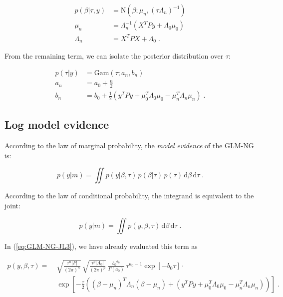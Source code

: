 \vspace{-0.5em}
\begin{equation} \label{eq:GLM-NG-post-beta}
\begin{split}
p(\beta|\tau,y) &= \mathrm{N}(\beta; \mu_n, (\tau \Lambda_n)^{-1}) \\
\mu_n &= \Lambda_n^{-1} (X^T P y + \Lambda_0 \mu_0) \\
\Lambda_n &= X^T P X + \Lambda_0 \; .
\end{split}
\end{equation}

From the remaining term, we can isolate the posterior distribution over $\tau$:

\vspace{-0.5em}
\begin{equation} \label{eq:GLM-NG-post-tau}
\begin{split}
p(\tau|y) &= \mathrm{Gam}(\tau; a_n, b_n) \\
a_n &= a_0 + \frac{n}{2} \\
b_n &= b_0 + \frac{1}{2} (y^T P y + \mu_0^T \Lambda_0 \mu_0 - \mu_n^T \Lambda_n \mu_n) \; .
\end{split}
\end{equation}


\subsection{Log model evidence} \label{sec:GLM-NG-LME}

According to the law of marginal probability, the \textit{model evidence} of the GLM-NG is:

\begin{equation} \label{eq:GLM-NG-ME1}
p(y|m) = \iint p(y|\beta,\tau) \, p(\beta|\tau) \, p(\tau) \, \mathrm{d}\beta \, \mathrm{d}\tau \; .
\end{equation}

According to the law of conditional probability, the integrand is equivalent to the joint:

\begin{equation} \label{eq:GLM-NG-ME2}
p(y|m) = \iint p(y,\beta,\tau) \, \mathrm{d}\beta \, \mathrm{d}\tau \; .
\end{equation}

\pagebreak
In (\ref{eq:GLM-NG-JL3}), we have already evaluated this term as

\vspace{-0.5em}
\begin{equation} \label{eq:GLM-NG-LME1}
\begin{split}
p(y,\beta,\tau) = \; & \sqrt{\frac{\tau^n |P|}{(2 \pi)^n}} \, \sqrt{\frac{\tau^p |\Lambda_0|}{(2 \pi)^p}} \, \frac{{b_0}^{a_0}}{\Gamma(a_0)} \, \tau^{a_0-1} \exp[-b_0 \tau] \cdot \\
& \exp\left[ -\frac{\tau}{2} \left( (\beta-\mu_n)^T \Lambda_n (\beta-\mu_n) + (y^T P y + \mu_0^T \Lambda_0 \mu_0 - \mu_n^T \Lambda_n \mu_n) \right) \right] \; .
\end{split}
\end{equation}

